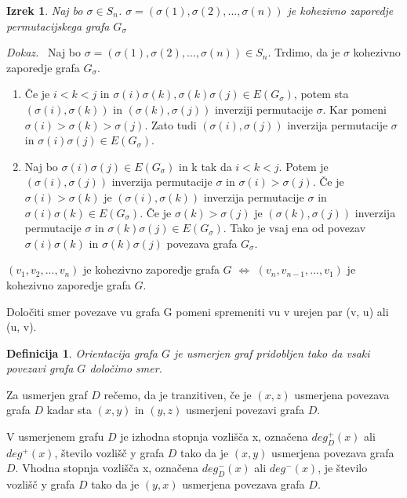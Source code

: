 \documentclass[a4paper, 12pt]{book}
\newtheorem{definicija}{Definicija}[chapter]
\newtheorem{izrek}{Izrek}[chapter]
\newenvironment{dokaz}{\emph{Dokaz.}\ }{\hspace{\fill}{$\Box$}}
\begin{document}
\begin{izrek}
\label{izrek_sigma_kohezivno_zaporedje}
    Naj bo $\sigma \in S_n$. $\sigma = (\sigma(1), \sigma(2), ..., \sigma(n))$ je kohezivno zaporedje permutacijskega grafa $G_{\sigma}$
\end{izrek}
\begin{dokaz}
    Naj bo $\sigma = (\sigma(1), \sigma(2), ..., \sigma(n)) \in S_n$. Trdimo, da je $\sigma$ kohezivno zaporedje grafa $G_{\sigma}$. 
    \begin{enumerate}[label=(\alph*)]
        \item Če je $i < k < j$ in $\sigma(i)\sigma(k), \sigma(k)\sigma(j) \in E(G_{\sigma})$, potem sta $(\sigma(i),\sigma(k))$ in $(\sigma(k),\sigma(j))$ inverziji permutacije $\sigma$. Kar pomeni $\sigma(i) > \sigma(k) > \sigma(j)$. Zato tudi $(\sigma(i),\sigma(j))$ inverzija permutacije $\sigma$ in $\sigma(i)\sigma(j) \in E(G_{\sigma})$.        

        \item Naj bo $\sigma(i)\sigma(j) \in E(G_{\sigma})$ in k tak da $i < k < j$. Potem je $(\sigma(i),\sigma(j))$ inverzija permutacije $\sigma$ in $\sigma(i) > \sigma(j)$. Če je $\sigma(i) > \sigma(k)$ je $(\sigma(i),\sigma(k))$ inverzija permutacije $\sigma$ in $\sigma(i)\sigma(k) \in E(G_{\sigma})$. Če je $\sigma(k) > \sigma(j)$ je $(\sigma(k), \sigma(j))$ inverzija permutacije $\sigma$ in $\sigma(k)\sigma(j) \in E(G_{\sigma})$. Tako je vsaj ena od povezav $\sigma(i)\sigma(k)$ in $\sigma(k)\sigma(j)$ povezava grafa $G_{\sigma}$.
    \end{enumerate}
\end{dokaz}

$(v_1, v_2, ..., v_n)$ je kohezivno zaporedje grafa $G$ $\Leftrightarrow$ $(v_n, v_{n-1}, ..., v_1)$ je kohezivno zaporedje grafa $G$.

Določiti smer povezave vu grafa G pomeni spremeniti vu v urejen par (v, u) ali (u, v).

\begin{definicija}
    Orientacija grafa $G$ je usmerjen graf pridobljen tako da vsaki povezavi grafa $G$ določimo smer.
\end{definicija}

Za usmerjen graf $D$ rečemo, da je tranzitiven, če je $(x, z)$ usmerjena povezava grafa $D$ kadar sta $(x, y)$ in $(y, z)$ usmerjeni povezavi grafa $D$. 

V usmerjenem grafu $D$ je izhodna stopnja vozlišča x, označena $deg_D^+(x)$ ali $deg^+(x)$, število vozlišč y grafa $D$ tako da je $(x, y)$ usmerjena povezava grafa $D$. Vhodna stopnja vozlišča x, označena $deg_D^-(x)$ ali $deg^-(x)$, je število vozlišč y grafa $D$ tako da je $(y, x)$ usmerjena povezava grafa $D$.
\end{document}
